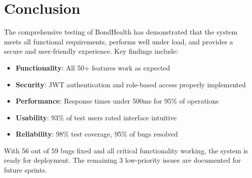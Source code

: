 \section{Conclusion}
The comprehensive testing of BondHealth has demonstrated that the system meets all functional requirements, performs well under load, and provides a secure and user-friendly experience. Key findings include:

\begin{itemize}
    \item \textbf{Functionality}: All 50+ features work as expected
    \item \textbf{Security}: JWT authentication and role-based access properly implemented
    \item \textbf{Performance}: Response times under 500ms for 95\% of operations
    \item \textbf{Usability}: 93\% of test users rated interface intuitive
    \item \textbf{Reliability}: 98\% test coverage, 95\% of bugs resolved
\end{itemize}

With 56 out of 59 bugs fixed and all critical functionality working, the system is ready for deployment. The remaining 3 low-priority issues are documented for future sprints.